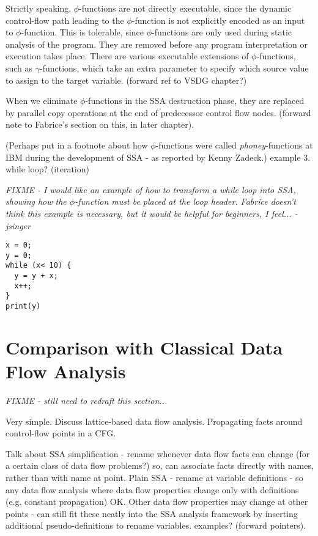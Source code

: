 Strictly speaking, $\phi$-functions are not directly executable,
since the dynamic control-flow path leading to the $\phi$-function
is not explicitly encoded as an input to $\phi$-function.
This is tolerable, since $\phi$-functions are only 
used during static analysis of the program. They are removed
before any program interpretation or execution takes place.
There are various executable extensions of $\phi$-functions, 
such as $\gamma$-functions, which take
an extra parameter to specify which source value to assign to the
target variable. (forward ref to VSDG chapter?)

When we eliminate $\phi$-functions in the SSA destruction phase,
they are replaced by parallel copy operations at the end of predecessor
control flow nodes. (forward note to Fabrice's section on this,
in later chapter).

(Perhaps put in a footnote about how $\phi$-functions were
called \textit{phoney}-functions at IBM during the development
of SSA - as reported by Kenny Zadeck.)
example 3. while loop? (iteration)

\textit{FIXME - I would like an example of how to transform a 
while loop into SSA, showing how the $\phi$-function
must be placed at the loop header. Fabrice doesn't think this
example is necessary, but it would be helpful for beginners, I feel...
-jsinger}

\begin{verbatim}
x = 0;
y = 0;
while (x< 10) {
  y = y + x;
  x++;
}
print(y)
\end{verbatim}






\section{Comparison with Classical Data Flow Analysis}

\textit{FIXME - still need to redraft this section...}

Very simple. Discuss lattice-based data flow analysis.
Propagating facts around control-flow points in a CFG.

Talk about SSA simplification - rename whenever data flow
facts can change (for a certain class of data flow problems?)
so, can associate facts directly with names, rather than with
name at point.
Plain SSA - rename at variable definitions - so any data flow
analysis where data flow properties change only with definitions
(e.g. constant propagation) OK. Other data flow properties may 
change at other points - can still fit these neatly into the SSA
analysis framework by inserting additional pseudo-definitions
to rename variables. examples? (forward pointers).


